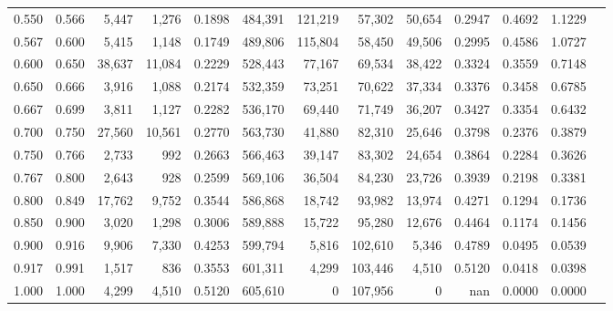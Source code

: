 \begin{tabular}{rrrrrrrrrrrrr}
0.550 & 0.566 &  5,447 &  1,276 &                                     0.1898 & 484,391 & 121,219 &  57,302 &  50,654 & 0.2947 & 0.4692 & 1.1229 \\
0.567 & 0.600 &  5,415 &  1,148 &                                     0.1749 & 489,806 & 115,804 &  58,450 &  49,506 & 0.2995 & 0.4586 & 1.0727 \\
0.600 & 0.650 & 38,637 & 11,084 &                                     0.2229 & 528,443 &  77,167 &  69,534 &  38,422 & 0.3324 & 0.3559 & 0.7148 \\
0.650 & 0.666 &  3,916 &  1,088 &                                     0.2174 & 532,359 &  73,251 &  70,622 &  37,334 & 0.3376 & 0.3458 & 0.6785 \\
0.667 & 0.699 &  3,811 &  1,127 &                                     0.2282 & 536,170 &  69,440 &  71,749 &  36,207 & 0.3427 & 0.3354 & 0.6432 \\
0.700 & 0.750 & 27,560 & 10,561 &                                     0.2770 & 563,730 &  41,880 &  82,310 &  25,646 & 0.3798 & 0.2376 & 0.3879 \\
0.750 & 0.766 &  2,733 &    992 &                                     0.2663 & 566,463 &  39,147 &  83,302 &  24,654 & 0.3864 & 0.2284 & 0.3626 \\
0.767 & 0.800 &  2,643 &    928 &                                     0.2599 & 569,106 &  36,504 &  84,230 &  23,726 & 0.3939 & 0.2198 & 0.3381 \\
0.800 & 0.849 & 17,762 &  9,752 &                                     0.3544 & 586,868 &  18,742 &  93,982 &  13,974 & 0.4271 & 0.1294 & 0.1736 \\
0.850 & 0.900 &  3,020 &  1,298 &                                     0.3006 & 589,888 &  15,722 &  95,280 &  12,676 & 0.4464 & 0.1174 & 0.1456 \\
0.900 & 0.916 &  9,906 &  7,330 &                                     0.4253 & 599,794 &   5,816 & 102,610 &   5,346 & 0.4789 & 0.0495 & 0.0539 \\
0.917 & 0.991 &  1,517 &    836 &                                     0.3553 & 601,311 &   4,299 & 103,446 &   4,510 & 0.5120 & 0.0418 & 0.0398 \\
1.000 & 1.000 &  4,299 &  4,510 &                                     0.5120 & 605,610 &       0 & 107,956 &       0 &    nan & 0.0000 & 0.0000 \\
\bottomrule
\end{tabular}
